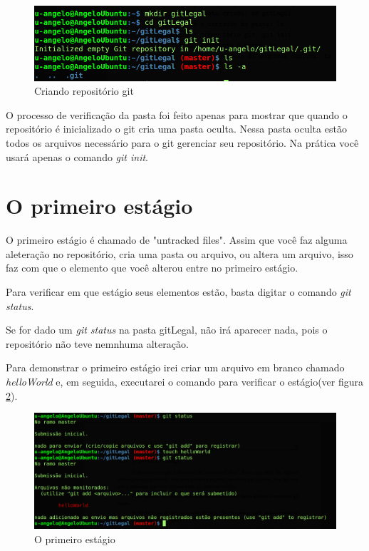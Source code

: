 \documentclass[12pt,openright,oneside,a4paper,english,brazil]{abntex2}
\begin{document}
\begin{figure}[h]
	\caption{\label{repositorio}Criando repositório git}
	\begin{center}
		\includegraphics[width=1\linewidth]{repositorio}
	\end{center}
\end{figure}

O processo de verificação da pasta foi feito apenas para mostrar que quando o repositório é inicializado o git cria uma pasta oculta. Nessa pasta oculta estão todos os arquivos necessário para o git gerenciar seu repositório. Na prática você usará apenas o comando \textit{git init}.

\section{O primeiro estágio}

O primeiro estágio é chamado de "untracked files". Assim que você faz alguma aleteração no repositório, cria uma pasta ou arquivo, ou altera um arquivo, isso faz com que o elemento que você alterou entre no primeiro estágio.

Para verificar em que estágio seus elementos estão, basta digitar o comando \textit{git status}.

Se for dado um \textit{git status} na pasta gitLegal, não irá aparecer nada, pois o repositório não teve nemnhuma alteração. 

Para demonstrar o primeiro estágio irei criar um arquivo em branco chamado \textit{helloWorld} e, em seguida, executarei o comando para verificar o estágio(ver figura \ref{estagio1}).

\begin{figure}[h]
	\caption{\label{estagio1}O primeiro estágio}
	\begin{center}
		\includegraphics[width=1\linewidth]{estagio1}
	\end{center}
\end{figure}
\end{document}
